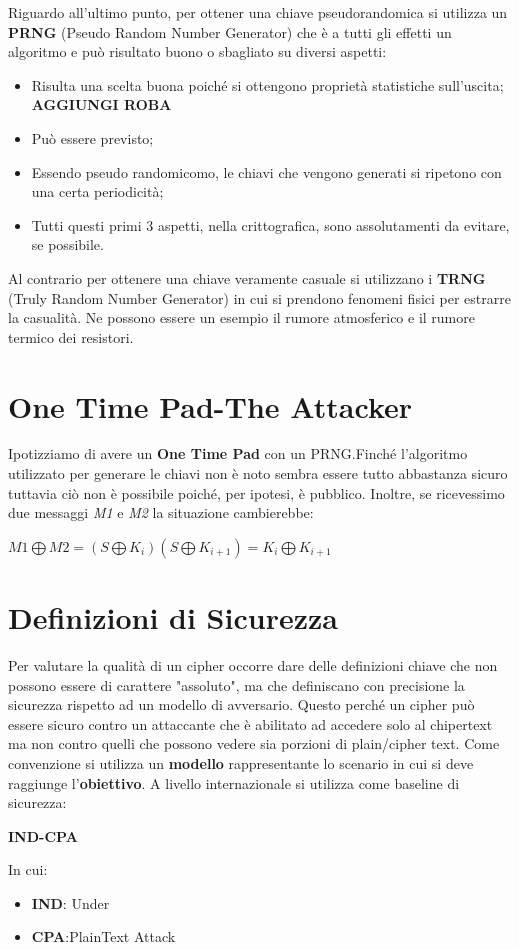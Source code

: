 \documentclass{book}
\theoremstyle{remark}
\begin{document}
Riguardo all'ultimo punto, per ottener una chiave pseudorandomica si utilizza un \textbf{PRNG} (Pseudo Random Number Generator) che è a tutti gli effetti un algoritmo e può risultato buono o sbagliato su diversi aspetti:
\begin{itemize}
	\item Risulta una scelta buona poiché si ottengono proprietà statistiche sull'uscita;\@\newline
	      \textbf{AGGIUNGI ROBA}
	\item Può essere previsto;\@
	\item Essendo pseudo randomicomo, le chiavi che vengono generati si ripetono con una certa periodicità;\@
	\item Tutti questi primi 3 aspetti, nella crittografica, sono assolutamenti da evitare, se possibile.
\end{itemize}
Al contrario per ottenere una chiave veramente casuale si utilizzano i \textbf{TRNG} (Truly Random Number Generator) in cui si prendono fenomeni fisici per estrarre la casualità. Ne possono essere un esempio il rumore atmosferico e il rumore termico dei resistori.
\chapter{One Time Pad-The Attacker}
Ipotizziamo di avere un \textbf{One Time Pad} con un PRNG.Finché l'algoritmo utilizzato per generare le chiavi non è noto sembra essere tutto abbastanza sicuro tuttavia ciò non è possibile poiché, per ipotesi, è pubblico. Inoltre, se ricevessimo due messaggi \emph{M1} e \emph{M2} la situazione cambierebbe:
\begin{center}
	\(M1\bigoplus M2 = (S\bigoplus K_i)(S\bigoplus K_{i+1}) = K_i\bigoplus K_{i+1}\)
\end{center}
\chapter{Definizioni di Sicurezza} Per valutare la qualità di un cipher occorre dare delle definizioni chiave che non possono essere di carattere "assoluto", ma che definiscano con precisione la sicurezza rispetto ad un modello di avversario. Questo perché un cipher può essere sicuro contro un attaccante che è abilitato ad accedere solo al chipertext ma non contro quelli che possono vedere sia porzioni di plain/cipher text. Come convenzione si utilizza un \textbf{modello} rappresentante lo scenario in cui si deve raggiunge l'\textbf{obiettivo}.
A livello internazionale si utilizza come baseline di sicurezza:
\begin{center}
	\textbf{IND-CPA}
\end{center}
In cui:\begin{itemize}
	\item \textbf{IND}:\@INDistinguishability \newline
	      Under
	\item \textbf{CPA}:\@Chosen PlainText Attack
\end{itemize}
\end{document}
